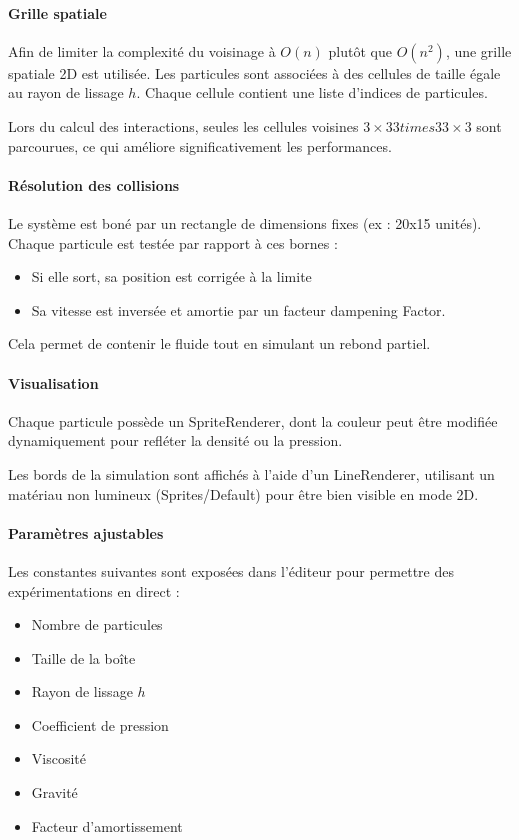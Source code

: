 \documentclass{article}
\begin{document}
\paragraph{Grille spatiale}

Afin de limiter la complexité du voisinage à \(O(n)\) plutôt que \(O(n^2)\), une grille spatiale 2D est utilisée. Les particules sont associées à des cellules de taille égale au rayon de lissage \(h\). Chaque cellule contient une liste d’indices de particules.

Lors du calcul des interactions, seules les cellules voisines \(3×33 times 33×3\) sont parcourues, ce qui améliore significativement les performances.

\paragraph{Résolution des collisions}

Le système est boné par un rectangle de dimensions fixes (ex : 20x15 unités). Chaque particule est testée par rapport à ces bornes :

\begin{itemize}
    \item Si elle sort, sa position est corrigée à la limite
    \item Sa vitesse est inversée et amortie par un facteur dampening Factor.
\end{itemize}

Cela permet de contenir le fluide tout en simulant un rebond partiel.

\paragraph{Visualisation}


Chaque particule possède un SpriteRenderer, dont la couleur peut être modifiée dynamiquement pour refléter la densité ou la pression.

Les bords de la simulation sont affichés à l’aide d’un LineRenderer, utilisant un matériau non lumineux (Sprites/Default) pour être bien visible en mode 2D.

\paragraph{Paramètres ajustables}

Les constantes suivantes sont exposées dans l’éditeur pour permettre des expérimentations en direct :

\begin{itemize}
    \item Nombre de particules
    \item Taille de la boîte 
    \item Rayon de lissage \(h\)
    \item Coefficient de pression
    \item Viscosité
    \item Gravité
    \item Facteur d'amortissement
\end{itemize}
\end{document}
